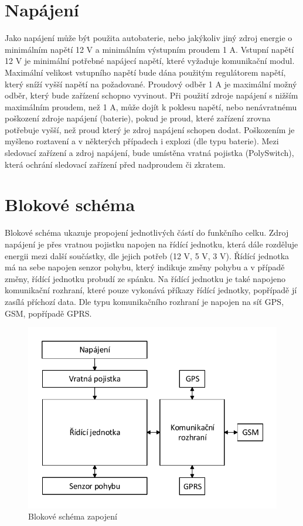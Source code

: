 \documentclass[FM,MP]{tulthesis}  %
\begin{document}
\section{Napájení}
Jako napájení může být použita autobaterie, nebo jakýkoliv jiný zdroj energie o minimálním napětí 12 V a minimálním výstupním proudem 1 A. Vstupní napětí 12 V je minimální potřebné napájecí napětí, které vyžaduje komunikační modul. Maximální velikost vstupního napětí bude dána použitým regulátorem napětí, který sníží vyšší napětí na požadované. Proudový odběr 1 A je maximální možný odběr, který bude zařízení schopno vyvinout. Při použití zdroje napájení s nižším maximálním proudem, než 1 A, může dojít k poklesu napětí, nebo nenávratnému poškození zdroje napájení (baterie), pokud je proud, které zařízení zrovna potřebuje vyšší, než proud který je zdroj napájení schopen dodat. Poškozením je myšleno roztavení a v některých případech i explozi (dle typu baterie). Mezi sledovací zařízení a zdroj napájení, bude umístěna vratná pojistka (PolySwitch), která ochrání sledovací zařízení před nadproudem či zkratem. 

\section{Blokové schéma}
Blokové schéma ukazuje propojení jednotlivých částí do funkčního celku. Zdroj napájení je přes vratnou pojistku napojen na řídící jednotku, která dále rozděluje energii mezi další součástky, dle jejich potřeb (12 V, 5 V, 3 V). Řídící jednotka má na sebe napojen senzor pohybu, který indikuje změny pohybu a v případě změny, řídící jednotku probudí ze spánku. Na řídící jednotku je také napojeno komunikační rozhraní, které pouze vykonává příkazy řídící jednotky, popřípadě jí zasílá příchozí data. Dle typu komunikačního rozhraní je napojen na síť GPS, GSM, popřípadě GPRS.

\begin{figure}[H]
\begin{center}
\includegraphics[width=\textwidth]{graphs/schema_blokove.pdf}
\caption{Blokové schéma zapojení}
\label{image}
\end{center}
\end{figure}
\end{document}
